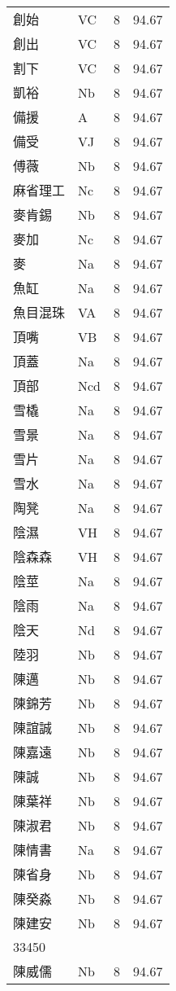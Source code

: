 \documentclass[twocolumn]{book}
\begin{document}
\begin{supertabular}{llrr}
創始 & VC & 8 &  94.67\\
創出 & VC & 8 &  94.67\\
割下 & VC & 8 &  94.67\\
凱裕 & Nb & 8 &  94.67\\
備援 & A & 8 &  94.67\\
備受 & VJ & 8 &  94.67\\
傅薇 & Nb & 8 &  94.67\\
麻省理工 & Nc & 8 &  94.67\\
麥肯錫 & Nb & 8 &  94.67\\
麥加 & Nc & 8 &  94.67\\
麥 & Na & 8 &  94.67\\
魚缸 & Na & 8 &  94.67\\
魚目混珠 & VA & 8 &  94.67\\
頂嘴 & VB & 8 &  94.67\\
頂蓋 & Na & 8 &  94.67\\
頂部 & Ncd & 8 &  94.67\\
雪橇 & Na & 8 &  94.67\\
雪景 & Na & 8 &  94.67\\
雪片 & Na & 8 &  94.67\\
雪水 & Na & 8 &  94.67\\
陶凳 & Na & 8 &  94.67\\
陰濕 & VH & 8 &  94.67\\
陰森森 & VH & 8 &  94.67\\
陰莖 & Na & 8 &  94.67\\
陰雨 & Na & 8 &  94.67\\
陰天 & Nd & 8 &  94.67\\
陸羽 & Nb & 8 &  94.67\\
陳邁 & Nb & 8 &  94.67\\
陳錦芳 & Nb & 8 &  94.67\\
陳誼誠 & Nb & 8 &  94.67\\
陳嘉遠 & Nb & 8 &  94.67\\
陳誠 & Nb & 8 &  94.67\\
陳葉祥 & Nb & 8 &  94.67\\
陳淑君 & Nb & 8 &  94.67\\
陳情書 & Na & 8 &  94.67\\
陳省身 & Nb & 8 &  94.67\\
陳癸淼 & Nb & 8 &  94.67\\
陳建安 & Nb & 8 &  94.67\\
33450\\
陳威儒 & Nb & 8 &  94.67\\

\end{supertabular}
\end{document}
